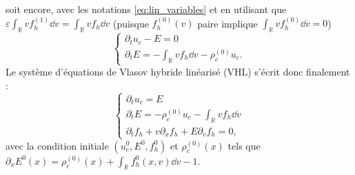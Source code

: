 soit encore, avec les notations \eqref{eq:lin_variables} et en utilisant que $\varepsilon \int_{\mathbb{R}} v f_h^{(1)}  \dd{v} = \int_{\mathbb{R}} v f_h  \dd{v}$ (puisque $f^{(0)}_h(v)$ paire implique  $\int_{\mathbb{R}} v f_h^{(0)}  \dd{v}  =0$) %
$$
  \begin{cases}
    \partial_t u_c -  E = 0 \\
    \partial_t E = -\int_{\mathbb{R}} vf_h\dd{v} - \rho_c^{(0)}u_c. 
  \end{cases}
$$
Le système d'équations de Vlasov hybride linéarisé (VHL) s'écrit donc finalement :
\begin{equation}
  \begin{cases}
    \partial_t u_c = E \\
    \partial_t E = -\rho_c^{(0)}u_c -\int_{\mathbb{R}} vf_h\dd{v} \\
    \partial_t f_h + v\partial_x f_h + E \partial_v f_h = 0,
  \end{cases}
\label{eq:vahl}
\end{equation}
avec la condition initiale $(u_c^{0}, E^{0}, f_h^{0})$ et $\rho_c^{(0)}(x)$ tels que $\partial_x E^{0}(x) = \rho_c^{(0)}(x) + \int_{\mathbb{R}} f_h^{0}(x, v) \dd{v} -1$. 


